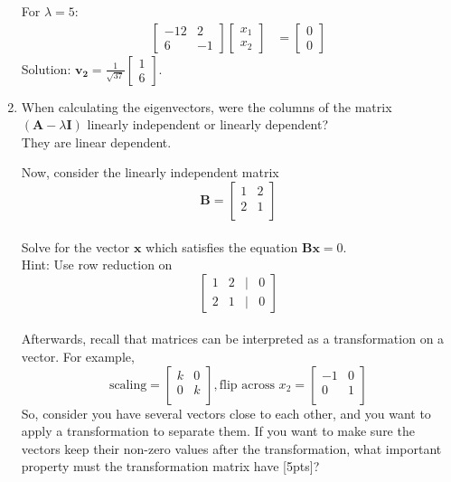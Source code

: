 \documentclass{article}
\begin{document}
\begin{enumerate}[label=(\alph*)]
    For $\lambda = 5$:
    \begin{align*}
        \begin{bmatrix} -12 & 2 \\ 6 & -1 \end{bmatrix} \begin{bmatrix} x_1 \\ x_2 \end{bmatrix} &= \begin{bmatrix} 0 \\ 0 \end{bmatrix}
    \end{align*}
    Solution: $\mathbf{v_2} = \frac{1}{\sqrt{37}} \begin{bmatrix} 1 \\ 6 \end{bmatrix}$.
    \item When calculating the eigenvectors, were the columns of the matrix $(\boldsymbol{A} - \lambda \boldsymbol{I} )$ linearly independent or linearly dependent? \\

    They are linear dependent.
    
    Now, consider the linearly independent matrix $$\boldsymbol{B} = \begin{bmatrix} 
    1 & 2  \\ 
    2 & 1 \\
    \end{bmatrix}$$\\
    Solve for the vector $\boldsymbol{x}$ which satisfies the equation $\boldsymbol{B} \boldsymbol{x} = 0$.\\Hint: Use row reduction on $$\begin{bmatrix} 
        1 & 2 & | & 0\\ 
        2 & 1 & | & 0
    \end{bmatrix}$$\\ Afterwards, recall that matrices can be interpreted as a transformation on a vector. For example,
    $$\text{scaling} = \begin{bmatrix} 
    k & 0  \\ 
    0 & k \\
    \end{bmatrix}, \text{flip across }x_2 = \begin{bmatrix} 
    -1 & 0  \\ 
    0 & 1 \\
    \end{bmatrix}$$
    So, consider you have several vectors close to each other, and you want to apply a transformation to separate them. If you want to make sure the vectors keep their non-zero values after the transformation, what important property must the transformation matrix have [5pts]?


\end{enumerate}
\end{document}
